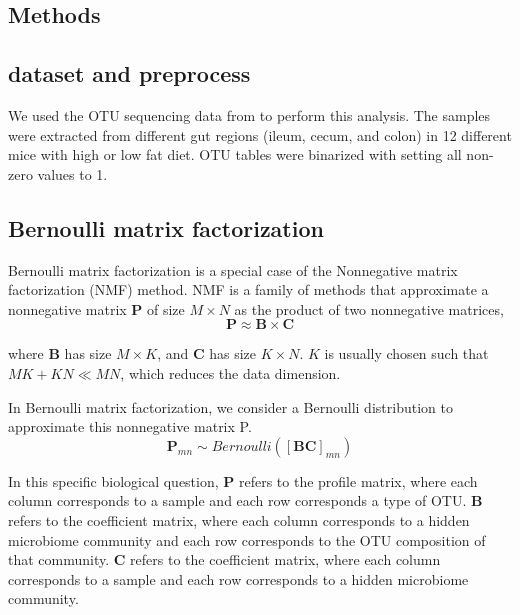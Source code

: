 \documentclass{bioinfo}
\begin{document}
\begin{methods}
\section{Methods}

\subsection{dataset and preprocess}

We used the OTU sequencing data from \cite{Sheth2019} to perform this analysis. The samples were extracted from different gut regions (ileum, cecum, and colon) in 12 different mice with high or low fat diet. OTU tables were binarized with setting all non-zero values to 1.


\subsection{Bernoulli matrix factorization}

Bernoulli matrix factorization is a special case of the Nonnegative matrix factorization (NMF) method. NMF is a family of methods that approximate a nonnegative matrix $\boldsymbol{P}$ of size $M \times N$ as the product of two nonnegative matrices, 
\begin{equation}
	\boldsymbol{P} \approx \boldsymbol{B} \times \boldsymbol{C}
\end{equation}

where $\boldsymbol{B}$ has size $M \times K$, and $\boldsymbol{C}$ has size $K \times N$. $K$ is usually chosen such that $MK + KN \ll MN$, which reduces the data dimension.

In Bernoulli matrix factorization, we consider a Bernoulli distribution to approximate this nonnegative matrix P. 
\begin{equation}
	\boldsymbol{P}_{mn} \sim Bernoulli([\boldsymbol{B}\boldsymbol{C}]_{mn})
\end{equation}

In this specific biological question, $\boldsymbol{P}$ refers to the profile matrix, where each column corresponds to a sample and each row corresponds a type of OTU. $\boldsymbol{B}$ refers to the coefficient matrix, where each column corresponds to a hidden microbiome community and each row corresponds to the OTU composition of that community. $\boldsymbol{C}$ refers to the coefficient matrix, where each column corresponds to a sample and each row corresponds to a hidden microbiome community. 


\end{methods}
\end{document}
